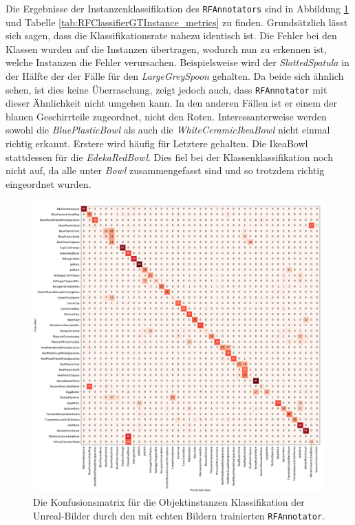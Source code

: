 Die Ergebnisse der Instanzenklassifikation des \texttt{RFAnnotators} sind in Abbildung \ref{fig:RFClassifierGTInstance_confMatrix} und Tabelle \ref{tab:RFClassifierGTInstance_metrics} zu finden. Grundsätzlich lässt sich sagen, dass die Klassifikationsrate nahezu identisch ist. Die Fehler bei den Klassen wurden auf die Instanzen übertragen, wodurch nun zu erkennen ist, welche Instanzen die Fehler verursachen. Beispielsweise wird der \textit{SlottedSpatula} in der Hälfte der der Fälle für den \textit{LargeGreySpoon} gehalten. Da beide sich ähnlich sehen, ist dies keine Überraschung, zeigt jedoch auch, dass \texttt{RFAnnotator} mit dieser Ähnlichkeit nicht umgehen kann. In den anderen Fällen ist er einem der blauen Geschirrteile zugeordnet, nicht den Roten. \newline
Interessanterweise werden sowohl die \textit{BluePlasticBowl} als auch die \textit{WhiteCeramicIkeaBowl} nicht einmal richtig erkannt. Erstere wird häufig für Letztere gehalten. Die IkeaBowl stattdessen für die \textit{EdekaRedBowl}. Dies fiel bei der Klassenklassifikation noch nicht auf, da alle unter \textit{Bowl} zusammengefasst sind und so trotzdem richtig eingeordnet wurden.   

\begin{figure}
\centering
	\includegraphics[scale=.3]{img/chapter6/RFClassifierGTInstance.png}
\caption[Konfusionsmatrix der Klassifizierung der Objektinstanzen durch den RFAnnotator]{Die Konfusionsmatrix für die Objektinstanzen Klassifikation der Unreal-Bilder durch den mit echten Bildern trainierten \texttt{RFAnnotator}.}
\label{fig:RFClassifierGTInstance_confMatrix}
\end{figure}

